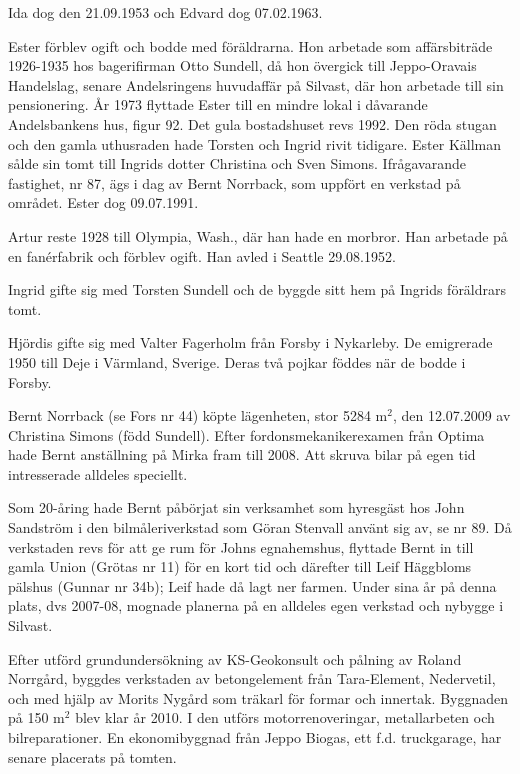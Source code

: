 Ida dog den 21.09.1953 och Edvard dog 07.02.1963.

Ester förblev ogift och bodde med föräldrarna. Hon arbetade som affärsbiträde 1926-1935 hos bagerifirman Otto Sundell, då hon övergick till Jeppo-Oravais Handelslag, senare Andelsringens huvudaffär på Silvast, där hon arbetade till sin pensionering. År 1973 flyttade Ester till en mindre lokal i dåvarande Andelsbankens hus, figur 92. Det gula bostadshuset revs 1992. Den röda stugan och den gamla uthusraden hade Torsten och Ingrid rivit tidigare. Ester Källman sålde sin tomt till Ingrids dotter Christina och Sven Simons. Ifrågavarande fastighet, nr 87, ägs i dag av Bernt Norrback, som uppfört en verkstad på området. Ester dog 09.07.1991.

Artur reste 1928 till Olympia, Wash., där han hade en morbror. Han 	arbetade på en fanérfabrik och förblev ogift. Han avled i Seattle 	29.08.1952.

Ingrid gifte sig med Torsten Sundell och de byggde sitt hem på Ingrids föräldrars tomt.

Hjördis gifte sig med Valter Fagerholm från Forsby i Nykarleby. De 	emigrerade 1950 till Deje i Värmland, Sverige. Deras två pojkar föddes när de bodde i Forsby.






Bernt Norrback (se Fors nr 44) köpte lägenheten, stor 5284 m$^2$, den 12.07.2009  av Christina Simons (född Sundell). Efter fordonsmekanikerexamen från Optima hade Bernt anställning på Mirka fram till 2008. Att skruva bilar på egen tid intresserade alldeles speciellt.

Som 20-åring hade Bernt påbörjat sin verksamhet som hyresgäst	hos John Sandström i den bilmåleriverkstad som Göran Stenvall använt sig av, se nr 89. Då verkstaden revs för att ge rum för Johns egnahemshus, flyttade Bernt in till gamla Union (Grötas nr 11) för en kort tid och därefter till Leif Häggbloms pälshus (Gunnar nr 34b); Leif hade då lagt ner farmen. Under sina år på denna plats, dvs 2007-08, mognade	planerna på en alldeles egen verkstad och nybygge i Silvast.

Efter utförd grundundersökning av KS-Geokonsult och pålning av Roland Norrgård, byggdes verkstaden av betongelement från Tara-Element, Nedervetil, och med hjälp av Morits Nygård som träkarl för formar och innertak. Byggnaden på 150 m$^2$ blev klar år 2010. I den utförs	motorrenoveringar, metallarbeten och bilreparationer. En ekonomibyggnad från Jeppo Biogas, ett f.d. truckgarage, har senare placerats på tomten.



